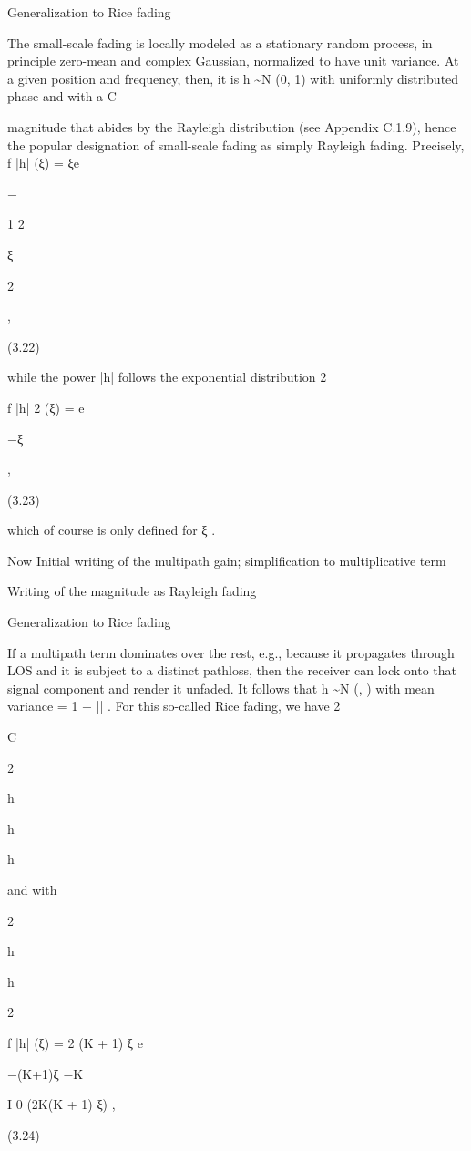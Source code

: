 {{{{Generalization to Rice fading

The small-scale fading is locally modeled as a stationary random process, in principle zero-mean and complex Gaussian, normalized to have unit variance. At a given position and frequency, then, it is h \sim N (0, 1) with uniformly distributed phase and with a C

magnitude that abides by the Rayleigh distribution (see Appendix C.1.9), hence the popular designation of small-scale fading as simply Rayleigh fading. Precisely,
f |h| (ξ) = ξe

−

1 2

ξ

2

,

(3.22)

while the power |h| follows the exponential distribution 2

f |h| 2 (ξ) = e

−ξ

,

(3.23)

which of course is only defined for ξ .

Now Initial writing of the multipath gain;
simplification to multiplicative term

Writing of the magnitude as Rayleigh fading

Generalization to Rice fading

If a multipath term dominates over the rest, e.g., because it propagates through LOS and it is subject to a distinct pathloss, then the receiver can lock onto that signal component and render it unfaded. It follows that h \sim N (\mu , \sigma ) with mean \mu variance \sigma = 1 − |\mu | . For this so-called Rice fading, we have 2

C

2

h

h

h


and with

2

h

h

2

f |h| (ξ) = 2 (K + 1) ξ e

−(K+1)ξ −K

I 0 (2\sqrt K(K + 1) ξ) ,

(3.24)

}}}}
